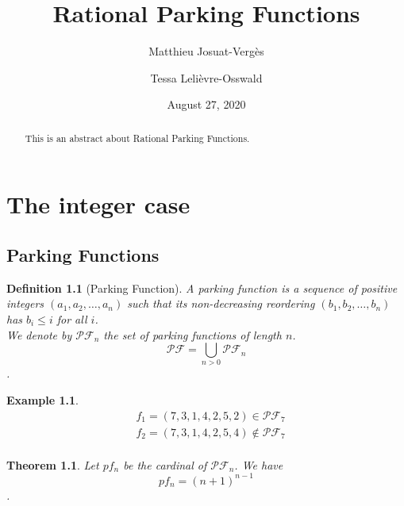 \documentclass[12pt]{report}
\newtheorem{theorem}{Theorem}
\newtheorem{definition}{Definition}
\newtheorem*{example}{Example}
\begin{document}
\title{Rational Parking Functions}
\author{Matthieu Josuat-Vergès \and Tessa Lelièvre-Osswald}
\date{August 27, 2020}

\maketitle

\begin{abstract}
    This is an abstract about Rational Parking Functions.
\end{abstract}

\tableofcontents

\chapter{The integer case}

\section{Parking Functions}

\begin{definition}[Parking Function]
    A \emph{parking function} is a sequence of positive integers
    $(a_1, a_2, \ldots, a_n)$
    such that its non-decreasing reordering $(b_1, b_2, \ldots, b_n)$
    has $b_i \leqslant i$ for all $i$.\\
    We denote by $\mathcal{PF}_n$ the set of parking functions of length $n$.
    $$\mathcal{PF} = \bigcup_{n > 0}{\mathcal{PF}_n}$$.
\end{definition}

\begin{example}
    \begin{align*}
    &f_1 = (7, 3, 1, 4, 2, 5, 2) \in \mathcal{PF}_7\\
    &f_2 = (7, 3, 1, 4, 2, 5, 4) \notin \mathcal{PF}_7\\
    \end{align*}
\end{example}

\begin{theorem}
    Let $pf_n$ be the cardinal of $\mathcal{PF}_n$.
    We have $$pf_n = (n + 1)^{n-1}$$.
\end{theorem}
\end{document}
